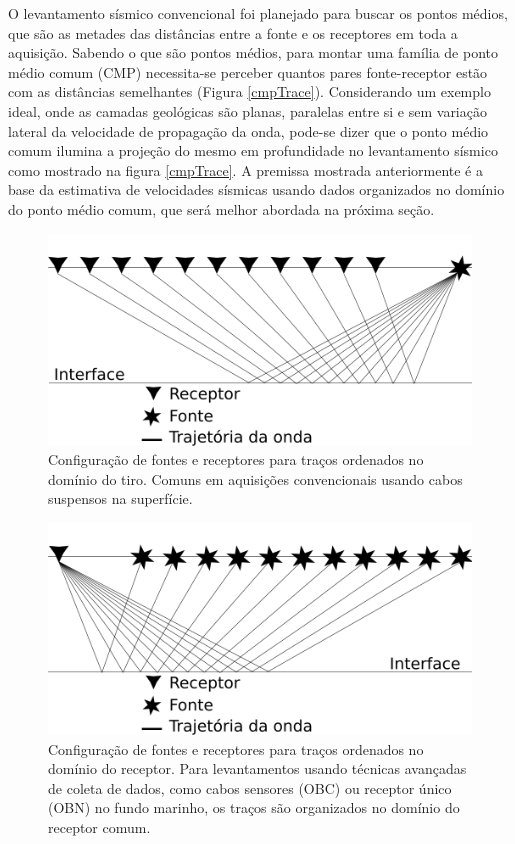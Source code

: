 \documentclass[
	12pt,				%
	openright,			%
	oneside,			%
	a4paper,			%
	english,			%
	brazil				%
	]{abntex2}
\begin{document}
    O levantamento sísmico convencional foi planejado para buscar os pontos médios, que são as metades das distâncias entre a fonte e os receptores em toda a aquisição. Sabendo o que são pontos médios, para montar uma família de ponto médio comum (CMP) necessita-se perceber quantos pares fonte-receptor estão com as distâncias semelhantes (Figura \ref{cmpTrace}). Considerando um exemplo ideal, onde as camadas geológicas são planas, paralelas entre si e sem variação lateral da velocidade de propagação da onda, pode-se dizer que o ponto médio comum ilumina a projeção do mesmo em profundidade no levantamento sísmico \cite{yilmaz2001seismic} como mostrado na figura \ref{cmpTrace}. A premissa mostrada anteriormente é a base da estimativa de velocidades sísmicas usando dados organizados no domínio do ponto médio comum, que será melhor abordada na próxima seção.     
%    
    \begin{figure}[htp!]
        \centering
        \includegraphics[scale=0.4]{../imagens/shot.png}
        \caption{Configuração de fontes e receptores para traços ordenados no domínio do tiro. Comuns em aquisições convencionais usando cabos suspensos na superfície.}
        \label{shotTrace}
    \end{figure}
    
    \begin{figure}[htp!]
        \centering
        \includegraphics[scale=0.4]{../imagens/recept.png}
        \caption{Configuração de fontes e receptores para traços ordenados no domínio do receptor. Para levantamentos usando técnicas avançadas de coleta de dados, como cabos sensores (OBC) ou receptor único (OBN) no fundo marinho, os traços são organizados no domínio do receptor comum.}
        \label{receptTrace}
    \end{figure}
\end{document}

